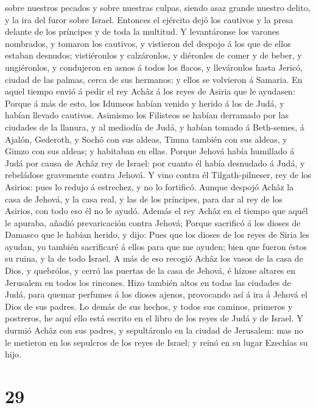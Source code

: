 sobre nuestros pecados y sobre nuestras culpas, siendo asaz grande
nuestro delito, y la ira del furor sobre Israel.  Entonces
el ejército dejó los cautivos y la presa delante de los príncipes y de
toda la multitud.  Y levantáronse los varones nombrados, y
tomaron los cautivos, y vistieron del despojo á los que de ellos estaban
desnudos; vistiéronlos y calzáronlos, y diéronles de comer y de beber, y
ungiéronlos, y condujeron en asnos á todos los flacos, y lleváronlos
hasta Jericó, ciudad de las palmas, cerca de sus hermanos; y ellos se
volvieron á Samaria.  En aquel tiempo envió á pedir el rey
Achâz á los reyes de Asiria que le ayudasen:  Porque á más
de esto, los Idumeos habían venido y herido á los de Judá, y habían
llevado cautivos.  Asimismo los Filisteos se habían
derramado por las ciudades de la llanura, y al mediodía de Judá, y
habían tomado á Beth-semes, á Ajalón, Gederoth, y Sochô con sus aldeas,
Timna también con sus aldeas, y Gimzo con sus aldeas; y habitaban en
ellas.  Porque Jehová había humillado á Judá por causa de
Achâz rey de Israel: por cuanto él había desnudado á Judá, y rebeládose
gravemente contra Jehová.  Y vino contra él
Tilgath-pilneser, rey de los Asirios: pues lo redujo á estrechez, y no
lo fortificó.  Aunque despojó Achâz la casa de Jehová, y la
casa real, y las de los príncipes, para dar al rey de los Asirios, con
todo eso él no le ayudó.  Además el rey Achâz en el tiempo
que aquél le apuraba, añadió prevaricación contra Jehová; 
Porque sacrificó á los dioses de Damasco que le habían herido, y dijo:
Pues que los dioses de los reyes de Siria les ayudan, yo también
sacrificaré á ellos para que me ayuden; bien que fueron éstos su ruina,
y la de todo Israel.  A más de eso recogió Achâz los vasos
de la casa de Dios, y quebrólos, y cerró las puertas de la casa de
Jehová, é hízose altares en Jerusalem en todos los rincones.
 Hizo también altos en todas las ciudades de Judá, para
quemar perfumes á los dioses ajenos, provocando así á ira á Jehová el
Dios de sus padres.  Lo demás de sus hechos, y todos sus
caminos, primeros y postreros, he aquí ello está escrito en el libro de
los reyes de Judá y de Israel.  Y durmió Achâz con sus
padres, y sepultáronlo en la ciudad de Jerusalem: mas no le metieron en
los sepulcros de los reyes de Israel; y reinó en su lugar Ezechîas su
hijo.

\hypertarget{section-28}{%
\section{29}\label{section-28}}

